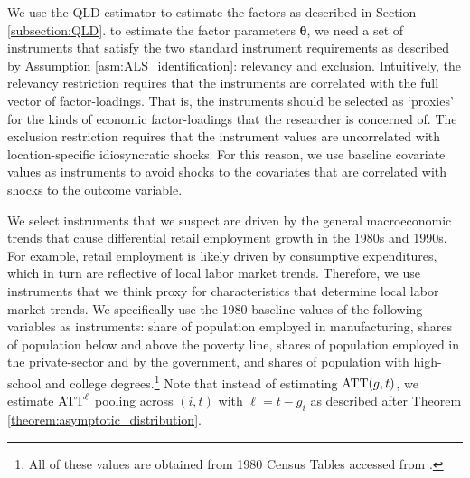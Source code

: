 \documentclass[12pt]{article}
\begin{document}
\begin{figure}
\end{figure}

We use the QLD estimator to estimate the factors as described in Section \ref{subsection:QLD}. to estimate the factor parameters $\bm \theta$, we need a set of instruments that satisfy the two standard instrument requirements as described by Assumption \ref{asm:ALS_identification}: relevancy and exclusion. Intuitively, the relevancy restriction requires that the instruments are correlated with the full vector of factor-loadings. That is, the instruments should be selected as `proxies' for the kinds of economic factor-loadings that the researcher is concerned of. The exclusion restriction requires that the instrument values are uncorrelated with location-specific idiosyncratic shocks. For this reason, we use baseline covariate values as instruments to avoid shocks to the covariates that are correlated with shocks to the outcome variable. 

We select instruments that we suspect are driven by the general macroeconomic trends that cause differential retail employment growth in the 1980s and 1990s. For example, retail employment is likely driven by consumptive expenditures, which in turn are reflective of local labor market trends. Therefore, we use instruments that we think proxy for characteristics that determine local labor market trends. We specifically use the 1980 baseline values of the following variables as instruments: share of population employed in manufacturing, shares of population below and above the poverty line, shares of population employed in the private-sector and by the government, and shares of population with high-school and college degrees.\footnote{All of these values are obtained from 1980 Census Tables accessed from \citet{manson2020ipums}.} Note that instead of estimating $\text{ATT}(g,t)$, we estimate $\text{ATT}^\ell$ pooling across $(i, t)$ with $\ell = t - g_i$ as described after Theorem \ref{theorem:asymptotic_distribution}.
\end{document}

